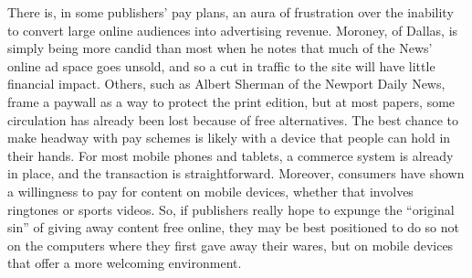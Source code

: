 There is, in some publishers’ pay plans, an aura of frustration over the inability
to convert large online audiences into advertising revenue. Moroney, of Dallas,
is simply being more candid than most when he notes that much of the News’
online ad space goes unsold, and so a cut in traffic to the site will have little financial
impact. Others, such as Albert Sherman of the Newport Daily News, frame a
paywall as a way to protect the print edition, but at most papers, some circulation
has already been lost because of free alternatives.
The best chance to make headway with pay schemes is likely with a device that
people can hold in their hands. For most mobile phones and tablets, a commerce
system is already in place, and the transaction is straightforward. Moreover, consumers
have shown a willingness to pay for content on mobile devices, whether
that involves ringtones or sports videos. So, if publishers really hope to expunge
the ``original sin'' of giving away content free online, they may be best positioned
to do so not on the computers where they first gave away their wares, but on
mobile devices that offer a more welcoming environment.


